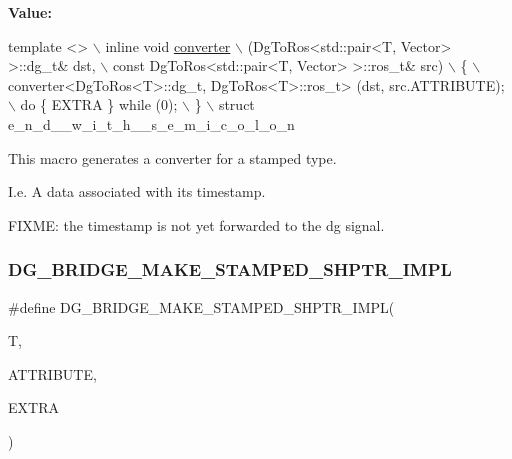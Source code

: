 {\bfseries Value\+:}
\begin{DoxyCode}
\textcolor{keyword}{template} <>                             \(\backslash\)
  inline \textcolor{keywordtype}{void} \hyperlink{namespacedynamic__graph_a38ff488b8b21c0b4f4d7f44572fa4ee5}{converter}                            \(\backslash\)
  (DgToRos<std::pair<T, Vector> >::dg\_t& dst,           \(\backslash\)
   const DgToRos<std::pair<T, Vector> >::ros\_t& src)        \(\backslash\)
  \{                                 \(\backslash\)
    converter<DgToRos<T>::dg\_t, DgToRos<T>::ros\_t> (dst, src.ATTRIBUTE); \(\backslash\)
    do \{ EXTRA \} \textcolor{keywordflow}{while} (0);                     \(\backslash\)
  \}                                 \(\backslash\)
  struct e\_n\_d\_\_w\_i\_t\_h\_\_s\_e\_m\_i\_c\_o\_l\_o\_n
\end{DoxyCode}


This macro generates a converter for a stamped type. 

I.\+e. A data associated with its timestamp.

F\+I\+X\+ME\+: the timestamp is not yet forwarded to the dg signal. \mbox{\label{converter_8hh_a2c8d741da8bc5978c852fb7b71ec26e7}} 
\subsubsection{\texorpdfstring{D\+G\+\_\+\+B\+R\+I\+D\+G\+E\+\_\+\+M\+A\+K\+E\+\_\+\+S\+T\+A\+M\+P\+E\+D\+\_\+\+S\+H\+P\+T\+R\+\_\+\+I\+M\+PL}{DG\_BRIDGE\_MAKE\_STAMPED\_SHPTR\_IMPL}}
{\footnotesize\ttfamily \#define D\+G\+\_\+\+B\+R\+I\+D\+G\+E\+\_\+\+M\+A\+K\+E\+\_\+\+S\+T\+A\+M\+P\+E\+D\+\_\+\+S\+H\+P\+T\+R\+\_\+\+I\+M\+PL(\begin{DoxyParamCaption}\item[{}]{T,  }\item[{}]{A\+T\+T\+R\+I\+B\+U\+TE,  }\item[{}]{E\+X\+T\+RA }\end{DoxyParamCaption})}

